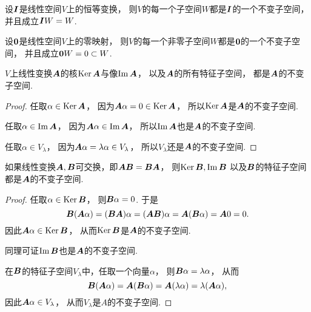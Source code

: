 \begin{example}
设\(\boldsymbol{I}\)是线性空间\(V\)上的恒等变换，
则\(V\)的每一个子空间\(W\)都是\(\boldsymbol{I}\)的一个不变子空间，
并且成立\(\boldsymbol{I}W = W\).
\end{example}
\begin{example}
设\(\boldsymbol0\)是线性空间\(V\)上的零映射，
则\(V\)的每一个非零子空间\(W\)都是\(\boldsymbol0\)的一个不变子空间，
并且成立\(\boldsymbol0W = 0 \subset W\).
\end{example}

\begin{proposition}%
\(V\)上线性变换\(\boldsymbol{A}\)的核\(\operatorname{Ker}\boldsymbol{A}\)与像\(\operatorname{Im}\boldsymbol{A}\)，
以及\(\boldsymbol{A}\)的所有特征子空间，
都是\(\boldsymbol{A}\)的不变子空间.
\begin{proof}
任取\(\alpha \in \operatorname{Ker}\boldsymbol{A}\)，
因为\(\boldsymbol{A}\alpha = 0 \in \operatorname{Ker}\boldsymbol{A}\)，
所以\(\operatorname{Ker}\boldsymbol{A}\)是\(\boldsymbol{A}\)的不变子空间.

任取\(\alpha \in \operatorname{Im}\boldsymbol{A}\)，
因为\(\boldsymbol{A}\alpha \in \operatorname{Im}\boldsymbol{A}\)，
所以\(\operatorname{Im}\boldsymbol{A}\)也是\(\boldsymbol{A}\)的不变子空间.

任取\(\alpha \in V_\lambda\)，
因为\(\boldsymbol{A}\alpha = \lambda \alpha \in V_\lambda\)，
所以\(V_\lambda\)还是\(\boldsymbol{A}\)的不变子空间.
\end{proof}
\end{proposition}

\begin{proposition}%
如果线性变换\(\boldsymbol{A},\boldsymbol{B}\)可交换，即\(\boldsymbol{A}\boldsymbol{B} = \boldsymbol{B}\boldsymbol{A}\)，
则\(\operatorname{Ker}\boldsymbol{B},
\operatorname{Im}\boldsymbol{B}\)
以及\(\boldsymbol{B}\)的特征子空间
都是\(\boldsymbol{A}\)的不变子空间.
\begin{proof}
任取\(\alpha \in \operatorname{Ker}\boldsymbol{B}\)，
则\(\boldsymbol{B}\alpha = 0\).
于是\begin{equation*}
	\boldsymbol{B}(\boldsymbol{A}\alpha)
	= (\boldsymbol{B}\boldsymbol{A})\alpha
	= (\boldsymbol{A}\boldsymbol{B})\alpha
	= \boldsymbol{A}(\boldsymbol{B}\alpha)
	= \boldsymbol{A}0
	= 0.
\end{equation*}
因此\(\boldsymbol{A}\alpha \in \operatorname{Ker}\boldsymbol{B}\)，
从而\(\operatorname{Ker}\boldsymbol{B}\)是\(\boldsymbol{A}\)的不变子空间.

同理可证\(\operatorname{Im}\boldsymbol{B}\)也是\(\boldsymbol{A}\)的不变子空间.

在\(\boldsymbol{B}\)的特征子空间\(V_\lambda\)中，任取一个向量\(\alpha\)，
则\(\boldsymbol{B}\alpha = \lambda \alpha\)，
从而\begin{equation*}
	\boldsymbol{B}(\boldsymbol{A}\alpha)
	= \boldsymbol{A}(\boldsymbol{B}\alpha)
	= \boldsymbol{A}(\lambda\alpha)
	= \lambda(\boldsymbol{A}\alpha),
\end{equation*}
因此\(\boldsymbol{A}\alpha \in V_\lambda\)，
从而\(V_\lambda\)是\(A\)的不变子空间.
\end{proof}
\end{proposition}

